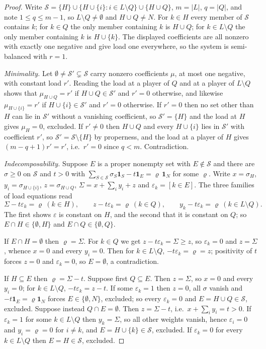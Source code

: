 \documentclass[11pt]{article}
\newcommand{\one}{\mathbf 1}
\begin{document}
\begin{proof}
Write $\mathcal S=\{H\}\cup\{H\cup\{i\}:i\in L\setminus Q\}\cup\{H\cup Q\}$,
$m=|L|$, $q=|Q|$, and note $1\le q\le m-1$, so $L\setminus Q\ne\emptyset$ and
$H\cup Q\ne N$.  For $k\in H$ every member of $\mathcal S$ contains $k$; for
$k\in Q$ the only member containing $k$ is $H\cup Q$; for $k\in L\setminus Q$
the only member containing $k$ is $H\cup\{k\}$.  The displayed coefficients are
all nonzero with exactly one negative and give load one everywhere, so the
system is semi-balanced with $r=1$.

\emph{Minimality.}  Let $\emptyset\ne\mathcal S'\subsetneq\mathcal S$ carry
nonzero coefficients $\mu$, at most one negative, with constant load $r'$.
Reading the load at a player of $Q$ and at a player of $L\setminus Q$ shows
that $\mu_{H\cup Q}=r'$ if $H\cup Q\in\mathcal S'$ and $r'=0$ otherwise, and
likewise $\mu_{H\cup\{i\}}=r'$ if $H\cup\{i\}\in\mathcal S'$ and $r'=0$
otherwise.  If $r'=0$ then no set other than $H$ can lie in $\mathcal S'$
without a vanishing coefficient, so $\mathcal S'=\{H\}$ and the load at $H$
gives $\mu_H=0$, excluded.  If $r'\ne0$ then $H\cup Q$ and every
$H\cup\{i\}$ lies in $\mathcal S'$ with coefficient $r'$, so
$\mathcal S'=\mathcal S\setminus\{H\}$ by properness, and the load at a player
of $H$ gives $(m-q+1)r'=r'$, i.e.\ $r'=0$ since $q<m$.  Contradiction.

\emph{Indecomposability.}  Suppose $E$ is a proper nonempty set with
$E\notin\mathcal S$ and there are $\sigma\ge0$ on $\mathcal S$ and $t>0$ with
$\sum_{S\in\mathcal S}\sigma_S\one_S-t\one_E=\varrho\,\one_N$
for some $\varrho$.  Write
$x=\sigma_H$, $y_i=\sigma_{H\cup\{i\}}$, $z=\sigma_{H\cup Q}$,
$\Sigma=x+\sum_iy_i+z$ and $\varepsilon_k=[k\in E]$.  The three families of
load equations read
\[
 \Sigma-t\varepsilon_k=\varrho\ (k\in H),\qquad
 z-t\varepsilon_k=\varrho\ (k\in Q),\qquad
 y_k-t\varepsilon_k=\varrho\ (k\in L\setminus Q).
\]
The first shows $\varepsilon$ is constant on $H$, and the second that it
is constant on $Q$; so $E\cap H\in\{\emptyset,H\}$ and
$E\cap Q\in\{\emptyset,Q\}$.

If $E\cap H=\emptyset$ then $\varrho=\Sigma$.  For $k\in Q$ we get
$z-t\varepsilon_k=\Sigma\ge z$, so $\varepsilon_k=0$ and $z=\Sigma$, whence
$x=0$ and every $y_i=0$.  Then for $k\in L\setminus Q$,
$-t\varepsilon_k=\varrho=z$; positivity of $t$ forces $z=0$ and
$\varepsilon_k=0$, so $E=\emptyset$, a contradiction.

If $H\subseteq E$ then $\varrho=\Sigma-t$.  Suppose first $Q\subseteq E$.  Then
$z=\Sigma$, so $x=0$ and every $y_i=0$; for $k\in L\setminus Q$,
$-t\varepsilon_k=z-t$.  If some $\varepsilon_k=1$ then $z=0$, all $\sigma$
vanish and $-t\one_E=\varrho\one_N$ forces $E\in\{\emptyset,N\}$, excluded; so every
$\varepsilon_k=0$ and $E=H\cup Q\in\mathcal S$, excluded.  Suppose instead
$Q\cap E=\emptyset$.  Then $z=\Sigma-t$, i.e.\ $x+\sum_iy_i=t>0$.  If
$\varepsilon_k=1$ for some $k\in L\setminus Q$ then $y_k=\Sigma$, so all other
weights vanish, hence $\varepsilon_i=0$ and $y_i=\varrho=0$ for $i\ne k$, and
$E=H\cup\{k\}\in\mathcal S$, excluded.  If $\varepsilon_k=0$ for every
$k\in L\setminus Q$ then $E=H\in\mathcal S$, excluded.


\end{proof}
\end{document}
